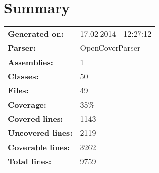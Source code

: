 \documentclass[a4paper,10pt]{article}
\begin{document}
\setcounter{secnumdepth}{-1}
\section{Summary}
\begin{longtable}[l]{ll}
\textbf{Generated on:} & 17.02.2014 - 12:27:12\\
\textbf{Parser:} & OpenCoverParser\\
\textbf{Assemblies:} & 1\\
\textbf{Classes:} & 50\\
\textbf{Files:} & 49\\
\textbf{Coverage:} & 35\%\\
\textbf{Covered lines:} & 1143\\
\textbf{Uncovered lines:} & 2119\\
\textbf{Coverable lines:} & 3262\\
\textbf{Total lines:} & 9759\\
\end{longtable}
\end{document}
